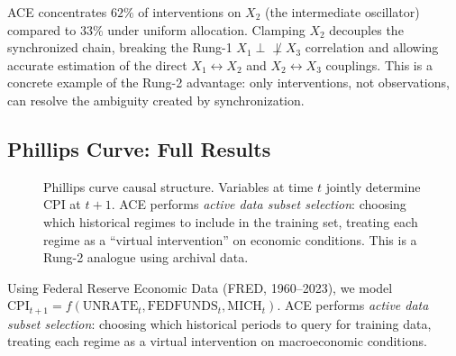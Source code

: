 \documentclass[twoside]{article}
\theoremstyle{plain}
\theoremstyle{definition}
\theoremstyle{remark}
\begin{document}
ACE concentrates $62\%$ of interventions on $X_2$ (the intermediate oscillator) compared to $33\%$ under uniform allocation. Clamping $X_2$ decouples the synchronized chain, breaking the Rung-1 $X_1 \perp\!\!\!\!\not\perp X_3$ correlation and allowing accurate estimation of the direct $X_1 \leftrightarrow X_2$ and $X_2 \leftrightarrow X_3$ couplings. This is a concrete example of the Rung-2 advantage: only interventions, not observations, can resolve the ambiguity created by synchronization.

\subsection{Phillips Curve: Full Results}
\label{app:phillips}

\begin{figure}[h]
\centering
{}
\caption{Phillips curve causal structure. Variables at time $t$ jointly determine CPI at $t+1$. ACE performs \emph{active data subset selection}: choosing which historical regimes to include in the training set, treating each regime as a ``virtual intervention'' on economic conditions. This is a Rung-2 analogue using archival data.}
\label{fig:phillips-scm}
\end{figure}

Using Federal Reserve Economic Data \citep{fred2024} (FRED, 1960--2023), we model $\text{CPI}_{t+1} = f(\text{UNRATE}_t, \text{FEDFUNDS}_t, \text{MICH}_t)$. ACE performs \emph{active data subset selection}: choosing which historical periods to query for training data, treating each regime as a virtual intervention on macroeconomic conditions.
\end{document}
